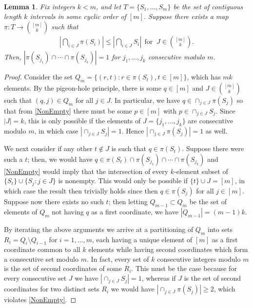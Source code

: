 \documentclass[journal, twocolumn]{IEEEtran}
\newtheorem{lemma}{Lemma}
\begin{document}

\begin{lemma}\label{NonEmptyLemma} Fix integers $k < m$, and let $T = \{S_1, \ldots, S_m\}$ be the set of contiguous length $k$ intervals in some cyclic order of $[m]$. Suppose there exists a map $\pi: T \to {[m] \choose k}$ such that
\begin{align}\label{NonEmpty}
|\bigcap_{i \in J} \pi(S_i)| \leq |\bigcap_{i \in J} S_i | \ \ \text{for } \ J \in {[m] \choose k}.
\end{align}
%
Then, $|\pi(S_{j_1}) \cap \cdots \cap \pi(S_{j_k})| = 1$ for $j_1,\ldots,j_k$ consecutive modulo $m$.
\end{lemma}

\begin{proof} Consider the set $Q_m = \{ (r,t) : r \in \pi(S_t), t \in [m] \}$, which has $mk$ elements. By the pigeon-hole principle, there is some $q \in [m]$ and $J \in {[m] \choose k}$ such that $(q, j) \in Q_m$ for all $j \in J$. In particular, we have $q \in \cap_{j \in J} \pi(S_j)$ so that from \eqref{NonEmpty} there must be some $p \in [m]$ with $p \in \cap_{j \in J} S_j$. Since $|J| = k$, this is only possible if the elements of $J = \{j_1, \ldots, j_k\}$ are consecutive modulo $m$, in which case $|\cap_{j \in J} S_j| = 1$. Hence $|\cap_{j \in J} \pi(S_j)| = 1$ as well.

We next consider if any other $t \notin J$ is such that $q \in \pi(S_t)$. Suppose there were such a $t$; then, we would have $q \in \pi(S_t) \cap \pi(S_{j_1}) \cap \cdots \cap \pi(S_{j_k})$ and \eqref{NonEmpty} would imply that the intersection of every $k$-element subset of $\{S_t\} \cup \{S_j: j \in J\}$ is nonempty. This would only be possible if $\{t\} \cup J = [m]$, in which case the result then trivially holds since then $q \in \pi(S_j)$ for all $j \in [m]$.  Suppose now there exists no such $t$; then letting $Q_{m-1} \subset Q_m$ be the set of elements of $Q_m$ not having $q$ as a first coordinate, we have $|Q_{m-1}| = (m-1)k$. 

By iterating the above arguments we arrive at a partitioning of $Q_m$ into sets $R_i = Q_i \setminus Q_{i-1}$ for $i = 1, \ldots, m$, each having a unique element of $[m]$ as a first coordinate common to all $k$ elements while having second coordinates which form a consecutive set modulo $m$. In fact, every set of $k$ consecutive integers modulo $m$ is the set of second coordinates of some $R_i$. This must be the case because for every consecutive set $J$ we have $|\cap_{j \in J} S_j| = 1$, whereas if $J$ is the set of second coordinates for two distinct sets $R_i$ we would have $|\cap_{j \in J} \pi(S_j)| \geq 2$, which violates \eqref{NonEmpty}. 
\end{proof}
\end{document}
